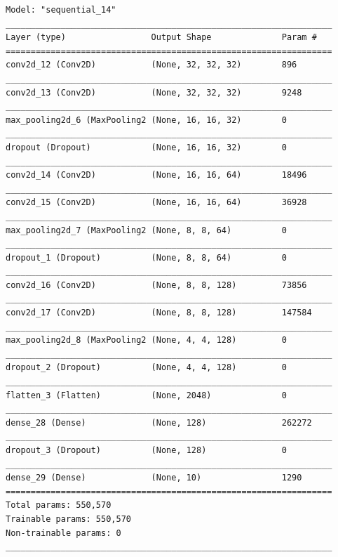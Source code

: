 \documentclass[10pt,english, openany]{book}
\begin{document}
\begin{verbatim}
Model: "sequential_14"
_________________________________________________________________
Layer (type)                 Output Shape              Param #   
=================================================================
conv2d_12 (Conv2D)           (None, 32, 32, 32)        896       
_________________________________________________________________
conv2d_13 (Conv2D)           (None, 32, 32, 32)        9248      
_________________________________________________________________
max_pooling2d_6 (MaxPooling2 (None, 16, 16, 32)        0         
_________________________________________________________________
dropout (Dropout)            (None, 16, 16, 32)        0         
_________________________________________________________________
conv2d_14 (Conv2D)           (None, 16, 16, 64)        18496     
_________________________________________________________________
conv2d_15 (Conv2D)           (None, 16, 16, 64)        36928     
_________________________________________________________________
max_pooling2d_7 (MaxPooling2 (None, 8, 8, 64)          0         
_________________________________________________________________
dropout_1 (Dropout)          (None, 8, 8, 64)          0         
_________________________________________________________________
conv2d_16 (Conv2D)           (None, 8, 8, 128)         73856     
_________________________________________________________________
conv2d_17 (Conv2D)           (None, 8, 8, 128)         147584    
_________________________________________________________________
max_pooling2d_8 (MaxPooling2 (None, 4, 4, 128)         0         
_________________________________________________________________
dropout_2 (Dropout)          (None, 4, 4, 128)         0         
_________________________________________________________________
flatten_3 (Flatten)          (None, 2048)              0         
_________________________________________________________________
dense_28 (Dense)             (None, 128)               262272    
_________________________________________________________________
dropout_3 (Dropout)          (None, 128)               0         
_________________________________________________________________
dense_29 (Dense)             (None, 10)                1290      
=================================================================
Total params: 550,570
Trainable params: 550,570
Non-trainable params: 0
_________________________________________________________________
\end{verbatim}
\end{document}

